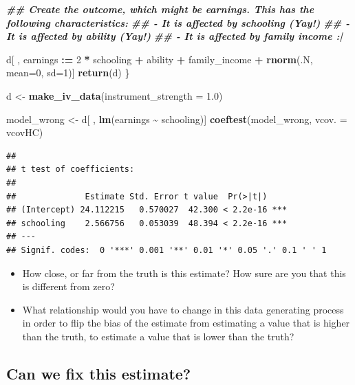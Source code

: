 \documentclass[
]{article}
\newenvironment{Shaded}{\begin{snugshade}}{\end{snugshade}}
\newcommand{\AttributeTok}[1]{\textcolor[rgb]{0.13,0.29,0.53}{#1}}
\newcommand{\DecValTok}[1]{\textcolor[rgb]{0.00,0.00,0.81}{#1}}
\newcommand{\DocumentationTok}[1]{\textcolor[rgb]{0.56,0.35,0.01}{\textbf{\textit{#1}}}}
\newcommand{\FloatTok}[1]{\textcolor[rgb]{0.00,0.00,0.81}{#1}}
\newcommand{\FunctionTok}[1]{\textcolor[rgb]{0.13,0.29,0.53}{\textbf{#1}}}
\newcommand{\NormalTok}[1]{#1}
\newcommand{\OtherTok}[1]{\textcolor[rgb]{0.56,0.35,0.01}{#1}}
\newcommand{\SpecialCharTok}[1]{\textcolor[rgb]{0.81,0.36,0.00}{\textbf{#1}}}
\providecommand{\tightlist}{%
  \setlength{\itemsep}{0pt}\setlength{\parskip}{0pt}}
\theoremstyle{definition}
\theoremstyle{definition}
\theoremstyle{definition}
\theoremstyle{definition}
\theoremstyle{remark}
\begin{document}
\begin{Shaded}
\begin{Highlighting}[]
  \DocumentationTok{\#\# Create the outcome, which might be earnings. This has the following characteristics: }
  \DocumentationTok{\#\#   {-} It is affected by schooling (Yay!) }
  \DocumentationTok{\#\#   {-} It is affected by ability (Yay!) }
  \DocumentationTok{\#\#   {-} It is affected by family income :| }
  
\NormalTok{  d[ , earnings }\SpecialCharTok{:=} \DecValTok{2} \SpecialCharTok{*}\NormalTok{ schooling }\SpecialCharTok{+}\NormalTok{ ability }\SpecialCharTok{+}\NormalTok{ family\_income }\SpecialCharTok{+}  \FunctionTok{rnorm}\NormalTok{(.N, }\AttributeTok{mean=}\DecValTok{0}\NormalTok{, }\AttributeTok{sd=}\DecValTok{1}\NormalTok{)]}
  \FunctionTok{return}\NormalTok{(d)}
\NormalTok{\}}

\NormalTok{d }\OtherTok{\textless{}{-}} \FunctionTok{make\_iv\_data}\NormalTok{(}\AttributeTok{instrument\_strength =} \FloatTok{1.0}\NormalTok{)}

\NormalTok{model\_wrong }\OtherTok{\textless{}{-}}\NormalTok{ d[ , }\FunctionTok{lm}\NormalTok{(earnings }\SpecialCharTok{\textasciitilde{}}\NormalTok{ schooling)]}
\FunctionTok{coeftest}\NormalTok{(model\_wrong, }\AttributeTok{vcov. =}\NormalTok{ vcovHC)}
\end{Highlighting}
\end{Shaded}

\begin{verbatim}
## 
## t test of coefficients:
## 
##              Estimate Std. Error t value  Pr(>|t|)    
## (Intercept) 24.112215   0.570027  42.300 < 2.2e-16 ***
## schooling    2.566756   0.053039  48.394 < 2.2e-16 ***
## ---
## Signif. codes:  0 '***' 0.001 '**' 0.01 '*' 0.05 '.' 0.1 ' ' 1
\end{verbatim}

\begin{itemize}
\tightlist
\item
  How close, or far from the truth is this estimate? How sure are you that this is different from zero?
\item
  What relationship would you have to change in this data generating process in order to flip the bias of the estimate from estimating a value that is higher than the truth, to estimate a value that is lower than the truth?
\end{itemize}

\subsection{Can we fix this estimate?}\label{can-we-fix-this-estimate}
\end{document}
